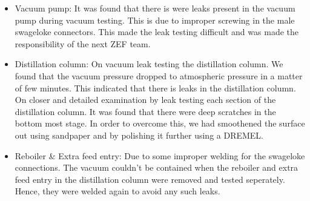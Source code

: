 \begin{itemize}
    \item Vacuum pump: It was found that there is were leaks present in the vacuum pump during vacuum testing. This is due to improper screwing in the male swageloke connectors. This made the leak testing difficult and was made the responsibility of the next ZEF team. 
    \item Distillation column: On vacuum leak testing the distillation column. We found that the vacuum pressure dropped to atmospheric pressure in a matter of few minutes. This indicated that there is leaks in the distillation column. On closer and detailed examination by leak testing each section of the distillation column. It was found that there were deep scratches in the bottom most stage. In order to overcome this, we had smoothened the surface out using sandpaper and by polishing it further using a DREMEL. 
    \item Reboiler \& Extra feed entry: Due to some improper welding for the swageloke connections. The vacuum couldn't be contained when the reboiler and extra feed entry in the distillation column were removed and tested seperately. Hence, they were welded again to avoid any such leaks. 
\end{itemize}


